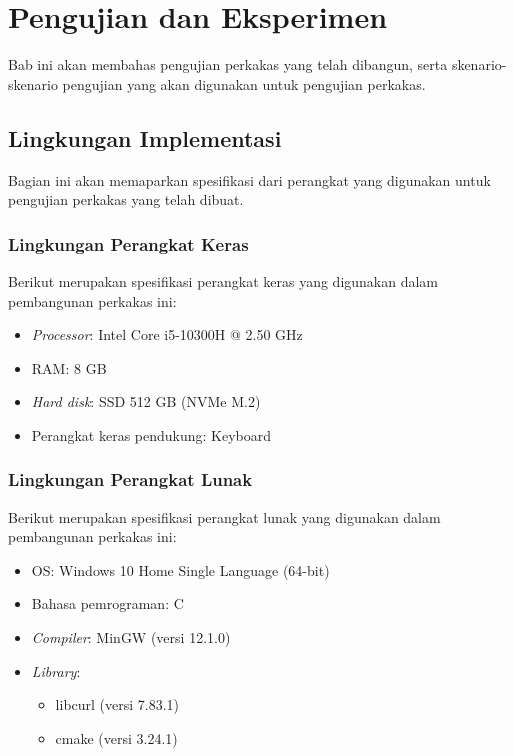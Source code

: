 \chapter{Pengujian dan Eksperimen}
\label{chap:testing}

Bab ini akan membahas pengujian perkakas yang telah dibangun, serta skenario-skenario pengujian yang akan digunakan untuk pengujian perkakas.

\section{Lingkungan Implementasi}
\label{sec:testing-specs}

Bagian ini akan memaparkan spesifikasi dari perangkat yang digunakan untuk pengujian perkakas yang telah dibuat. 

\subsection{Lingkungan Perangkat Keras}
\label{sec:testing-specs-hardware}

Berikut merupakan spesifikasi perangkat keras yang digunakan dalam pembangunan perkakas ini:

\begin{itemize}
	\item \textit{Processor}: Intel\logoregistered\xspace Core\logotrademark\xspace i5-10300H @ 2.50 GHz
	\item RAM: 8 GB
	\item \textit{Hard disk}: SSD 512 GB (NVMe\logotrademark\xspace M.2)
	\item Perangkat keras pendukung: Keyboard
\end{itemize}

\subsection{Lingkungan Perangkat Lunak}
\label{sec:testing-specs-software}

Berikut merupakan spesifikasi perangkat lunak yang digunakan dalam pembangunan perkakas ini:

\begin{itemize}
	\item OS: Windows 10 Home Single Language (64-bit)
	\item Bahasa pemrograman: C
	\item \textit{Compiler}: MinGW (versi 12.1.0)
	\item \textit{Library}:
	
	\begin{itemize}
		\item libcurl (versi 7.83.1)
		\item cmake (versi 3.24.1)
	\end{itemize}
	
\end{itemize}

